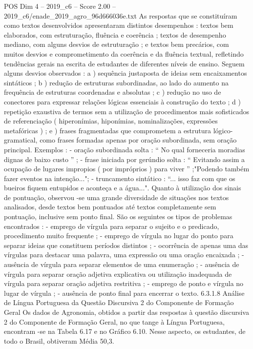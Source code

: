 \begin{textsample}{POS Dim 4 – 2019\_c6 – Score 2.00 – 2019\_c6/enade\_2019\_agro\_96d666036e.txt}
As respostas que se constituíram como textos desenvolvidos apresentaram distintos desempenhos : textos bem elaborados, com estruturação, fluência e coerência ; textos de desempenho mediano, com alguns desvios de estruturação ; e textos bem precários, com muitos desvios e comprometimento da coerência e da fluência textual, refletindo tendências gerais na escrita de estudantes de diferentes níveis de ensino.
Seguem alguns desvios observados : a ) sequência justaposta de ideias sem encaixamentos sintáticos ; b ) redução de estruturas subordinadas, ao lado do aumento na frequência de estruturas coordenadas e absolutas ; c ) redução no uso de conectores para expressar relações lógicas essenciais à construção do texto ; d ) repetição exaustiva de termos sem a utilização de procedimentos mais sofisticados de referenciação ( hiperonímias, hiponímias, nominalizações, expressões metafóricas ) ; e ) frases fragmentadas que comprometem a estrutura lógico-gramatical, como frases formadas apenas por oração subordinada, sem oração principal.
Exemplos : - oração subordinada solta : “ No qual forneceria moradias dignas de baixo custo ” ; - frase iniciada por gerúndio solta : “ Evitando assim a ocupação de lugares impropios ( por impróprios ) para viver ” ;"Podendo também fazer eventos na intenção..."; - truncamento sintático : “... isso faz com que os bueiros fiquem entupidos e aconteça e a água...".
Quanto à utilização dos sinais de pontuação, observou -se uma grande diversidade de situações nos textos analisados, desde textos bem pontuados até textos completamente sem pontuação, inclusive sem ponto final.
São os seguintes os tipos de problemas encontrados : - emprego de vírgula para separar o sujeito e o predicado, procedimento muito frequente ; - emprego de vírgula no lugar do ponto para separar ideias que constituem períodos distintos ; - ocorrência de apenas uma das vírgulas para destacar uma palavra, uma expressão ou uma oração encaixada ; - ausência de vírgula para separar elementos de uma enumeração ; - ausência de vírgula para separar oração adjetiva explicativa ou utilização inadequada de vírgula para separar oração adjetiva restritiva ; - emprego de ponto e vírgula no lugar de vírgula ; - ausência de ponto final para encerrar o texto. 6.3.1.8 Análise de Língua Portuguesa da Questão Discursiva 2 do Componente de Formação Geral Os dados de Agronomia, obtidos a partir das respostas à questão discursiva 2 do Componente de Formação Geral, no que tange à Língua Portuguesa, encontram -se na Tabela 6.17 e no Gráfico 6.10.
Nesse aspecto, os estudantes, de todo o Brasil, obtiveram Média 50,3.

\end{textsample}
